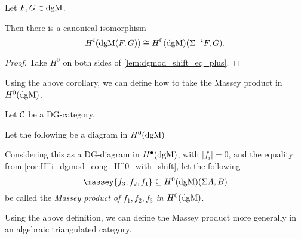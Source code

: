 \begin{corollary}
    \label{cor:H^i_dgmod_cong_H^0_with_shift}
    Let \( F, G \in \operatorname{dgM} \).

    Then there is a canonical isomorphism
    \[
        H^i(\operatorname{dgM}(F, G)) \cong H^0(\operatorname{dgM})(\Sigma^{-i} F, G).
    \]
\end{corollary}
\begin{proof}
    Take \( H^0 \) on both sides of \autoref{lem:dgmod_shift_eq_plus}.
\end{proof}

Using the above corollary, we can define how to take the Massey product in \( H^0(\operatorname{dgM}) \).

\begin{definition}
    \label{def:massey_product_H^0(dgMod_dg(C))}
    Let \( {\mathcal{C}} \) be a DG-category.
    
    Let the following be a diagram in \( H^0(\operatorname{dgM}) \)
    \begin{center}
    \end{center}
    Considering this as a DG-diagram in \( H^{\bullet}(\operatorname{dgM}) \), with \( |f_i| = 0 \), and the equality from \autoref{cor:H^i_dgmod_cong_H^0_with_shift}, let the following
    \[
        \massey{f_3, f_2, f_1} \subseteq H^0(\dgM)(\Sigma A, B)
    \]
    be called the \emph{Massey product of \( f_1, f_2, f_3 \) in \( H^0(\operatorname{dgM}) \)}.
\end{definition}

Using the above definition, we can define the Massey product more generally in an algebraic triangulated category.

